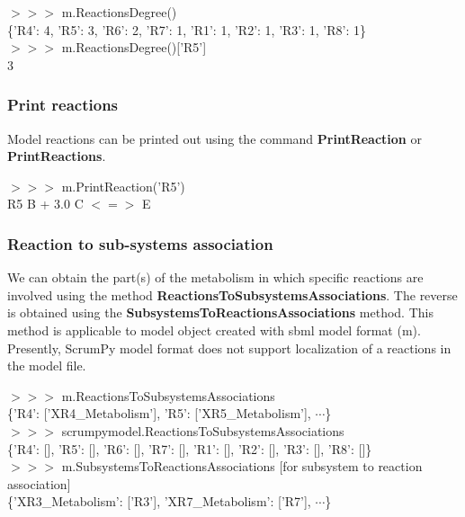 \begin{framed}
$>>>$ m.ReactionsDegree()\\
\{'R4': 4, 'R5': 3, 'R6': 2, 'R7': 1, 'R1': 1, 'R2': 1, 'R3': 1, 'R8': 1\}\\

$>>>$ m.ReactionsDegree()['R5']\\
3
\end{framed}


\subsubsection{Print reactions}
Model reactions can be printed out using the command \textbf{PrintReaction} or \textbf{PrintReactions}.

\begin{framed}
$>>>$ m.PrintReaction('R5')\\ 
R5 \space B + 3.0 C $<=>$ E
\end{framed}


\subsubsection{Reaction to sub-systems association}
We can obtain the part(s) of the metabolism in which specific reactions are involved using the method \textbf{ReactionsToSubsystemsAssociations}. The reverse is obtained using the \textbf{SubsystemsToReactionsAssociations} method. This method is applicable to model object created with sbml model format (m). Presently, ScrumPy model format does not support localization of a reactions in the model file.

\begin{framed}
$>>>$ m.ReactionsToSubsystemsAssociations\\
\{'R4': ['XR4\_Metabolism'], 'R5': ['XR5\_Metabolism'], $\cdots$\}\\

$>>>$ scrumpymodel.ReactionsToSubsystemsAssociations\\
\{'R4': [], 'R5': [], 'R6': [], 'R7': [], 'R1': [], 'R2': [], 'R3': [], 'R8': []\}\\

$>>>$ m.SubsystemsToReactionsAssociations [for subsystem to reaction association]\\
\{'XR3\_Metabolism': ['R3'], 'XR7\_Metabolism': ['R7'], $\cdots$\}
\end{framed}

